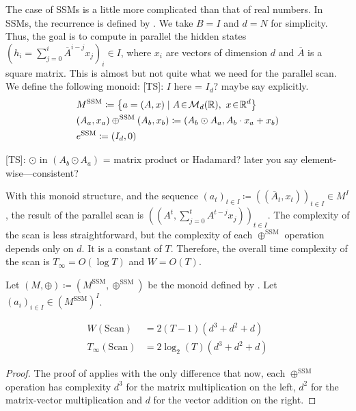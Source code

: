 \documentclass{article}
\newcommand{\TS}[1]{{\color{pink}[TS]: #1}}
\begin{document}
The case of SSMs is a little more complicated than that of real numbers. In SSMs, the recurrence is defined by . We take $B = I$ and $d = N$ for simplicity. Thus, the goal is to compute in parallel the hidden states $(h_i = \sum_{j=0}^i\overline{A}^{i-j}x_j)_i\in I$, where $x_i$ are vectors of dimension $d$ and $\overline{A}$ is a square matrix. This is almost but not quite what we need for the parallel scan. We define the following monoid:
\TS{$I$ here = $I_d$? maybe say explicitly.}
\begin{align}
\label{eq:M_SSM}
    &M^{\mathrm{SSM}}\coloneqq \left\{a = (A, x)\mid A\!\in\!\mathcal{M}_{d}(\mathbb{R}),~x\!\in\!\mathbb{R}^d\right\}\\
\label{eq:+_SSM}
    &(A_a, x_a) \oplus^{\mathrm{SSM}} (A_b,x_b)\coloneqq (A_b \odot A_a, A_b \cdot x_a + x_b)\\
\label{eq:0_SSM}
    &e^{\mathrm{SSM}}\coloneqq(I_d, 0)
\end{align}

\TS{$\odot$ in $(A_b\odot A_a)$ = matrix product or Hadamard? later you say element-wise—consistent?}

With this monoid structure, and the sequence $(a_t)_{t\in I} \coloneqq ((\overline{A}_t, x_t))_{t\in I} \in M^I$, the result of the parallel scan is $((A^t, \sum_{j=0}^tA^{t-j}x_j))_{t\in I}$. The complexity of the scan is less straightforward, but the complexity of each $\oplus^{\mathrm{SSM}}$ operation depends only on $d$. It is a constant of $T$. Therefore, the overall time complexity of the scan is $T_\infty= O(\log T)$ and $W=O(T)$.

\begin{proposition}
    Let $(M, \oplus) \coloneqq (M^{\mathrm{SSM}}, \oplus^{\mathrm{SSM}})$ be the monoid defined by . Let $(a_i)_{i\in I}\in (M^{\mathrm{SSM}})^I$.

\begin{align}
    W(\mathrm{Scan})&= 2(T-1)(d^3+d^2+d)\\
    T_\infty(\mathrm{Scan})&= 2\log_2 (T) (d^3+d^2+d)
\end{align}
\end{proposition}

\begin{proof}
The proof of  applies with the only difference that now, each $\oplus^{\mathrm{SSM}}$ operation has complexity $d^3$ for the matrix multiplication on the left, $d^2$ for the matrix-vector multiplication and $d$ for the vector addition on the right.
\end{proof}
\end{document}
